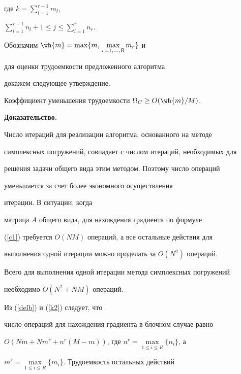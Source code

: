 где $k=\sum\limits_{l=1}^{r-1}m_{l}$,


$\sum\limits_{l=1}^{r-1}n_{l}+1\leq j


\leq \sum\limits_{l=1}^{r}n_{r}$.





Обозначим $\wh{m} = \max\{m,\,\max\limits_{r=1,\dotsc,R}m_r\}$ и


для оценки трудоемкости предложенного алгоритма


докажем следующее утверждение.





\begin{lem}\label{OKUTSB}


Коэффициент уменьшения трудоемкости $\Omega_C\ge O(\wh{m}/M)$.


\end{lem}





{\bf Доказательство.}


Число итераций для реализации алгоритма, основанного на методе


симплексных погружений, совпадает с числом итераций, необходимых для


решения задачи общего вида этим методом. Поэтому число операций


уменьшается за счет более экономного осуществления


итерации.  В ситуации, когда


матрица $A$ общего вида, для нахождения градиента по формуле


(\ref{c1}) требуется $O(NM)$ операций, а все остальные действия для


выполнения одной итерации можно проделать за $O(N^2)$ операций.


Всего для выполнения одной итерации метода симплексных погружений


необходимо $O(N^2+NM)$ операций.





Из (\ref{delb}) и (\ref{k2}) следует, что


число операций для нахождения градиента в блочном случае равно


$O(Nm+Nm^r+n^r(M-m))$, где $n^r=\max\limits_{1\leq i\leq R}\{n_i\}$, а


$m^r=\max\limits_{1\leq i\leq R}\{m_i\}$. Трудоемкость остальных действий



